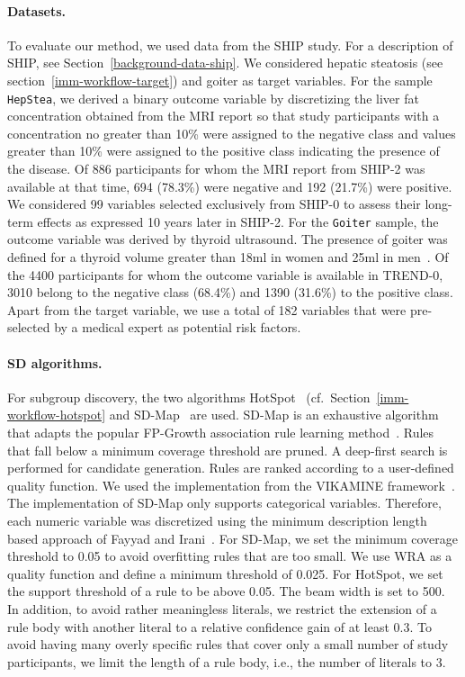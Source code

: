 \documentclass[
  oneside]{book}
\begin{document}
\paragraph*{Datasets.}

To evaluate our method, we used data from the SHIP study.
For a description of SHIP, see Section~\ref{background-data-ship}.
We considered hepatic steatosis (see section~\ref{imm-workflow-target}) and goiter as target variables.
For the sample \texttt{HepStea}, we derived a binary outcome variable by discretizing the liver fat concentration obtained from the MRI report so that study participants with a concentration no greater than 10\% were assigned to the negative class and values greater than 10\% were assigned to the positive class indicating the presence of the disease.
Of 886 participants for whom the MRI report from SHIP-2 was available at that time, 694 (78.3\%) were negative and 192 (21.7\%) were positive.
We considered 99 variables selected exclusively from SHIP-0 to assess their long-term effects as expressed 10 years later in SHIP-2.
For the \texttt{Goiter} sample, the outcome variable was derived by thyroid ultrasound.
The presence of goiter was defined for a thyroid volume greater than 18ml in women and 25ml in men~\autocite{Gutekunst:88}.
Of the 4400 participants for whom the outcome variable is available in TREND-0, 3010 belong to the negative class (68.4\%) and 1390 (31.6\%) to the positive class.
Apart from the target variable, we use a total of 182 variables that were pre-selected by a medical expert as potential risk factors.

\paragraph*{SD algorithms.}

For subgroup discovery, the two algorithms HotSpot~\autocite{Hall:Weka09} (cf.~Section~\ref{imm-workflow-hotspot} and SD-Map~\autocite{Atzmueller:SD-Map:06} are used.
SD-Map is an exhaustive algorithm that adapts the popular FP-Growth association rule learning method~\autocite{Han:FPGrowth00}.
Rules that fall below a minimum coverage threshold are pruned.
A deep-first search is performed for candidate generation.
Rules are ranked according to a user-defined quality function.
We used the implementation from the VIKAMINE framework~\autocite{Atzmueller:VIKAMINE12}.
The implementation of SD-Map only supports categorical variables.
Therefore, each numeric variable was discretized using the minimum description length based approach of Fayyad and Irani~\autocite{Fayyad:MDL93}.
For SD-Map, we set the minimum coverage threshold to 0.05 to avoid overfitting rules that are too small.
We use WRA as a quality function and define a minimum threshold of 0.025.
For HotSpot, we set the support threshold of a rule to be above 0.05.
The beam width is set to 500.
In addition, to avoid rather meaningless literals, we restrict the extension of a rule body with another literal to a relative confidence gain of at least 0.3.
To avoid having many overly specific rules that cover only a small number of study participants, we limit the length of a rule body, i.e., the number of literals to 3.
\end{document}
